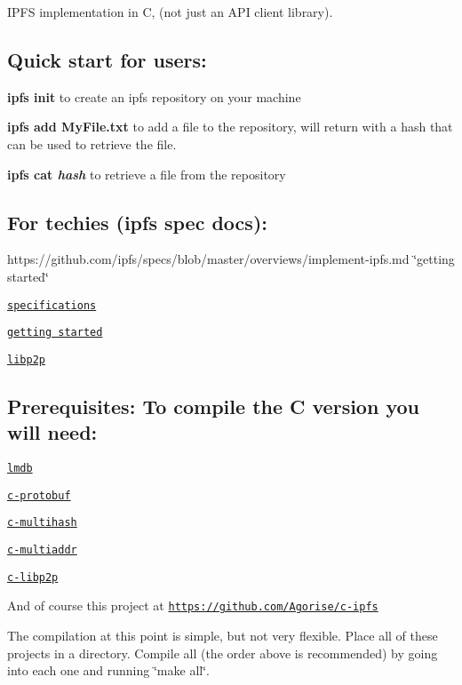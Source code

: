 I\+P\+FS implementation in C, (not just an A\+PI client library).

\subsection*{Quick start for users\+:}


\begin{DoxyItemize}
\item {\bfseries ipfs init} to create an ipfs repository on your machine
\item {\bfseries ipfs add My\+File.\+txt} to add a file to the repository, will return with a hash that can be used to retrieve the file.
\item {\bfseries ipfs cat {\itshape hash}} to retrieve a file from the repository
\end{DoxyItemize}

\subsection*{For techies (ipfs spec docs)\+:}


\begin{DoxyItemize}
\item https\+://github.com/ipfs/specs/blob/master/overviews/implement-\/ipfs.\+md \char`\"{}getting started\char`\"{}
\item \href{https://github.com/ipfs/specs}{\tt specifications}
\item \href{https://github.com/ipfs/community/issues/177}{\tt getting started}
\item \href{https://github.com/libp2p/specs}{\tt libp2p}
\end{DoxyItemize}

\subsection*{Prerequisites\+: To compile the C version you will need\+:}


\begin{DoxyItemize}
\item \href{https://github.com/jmjatlanta/lmdb}{\tt lmdb}
\item \href{https://github.com/Agorise/c-protobuf}{\tt c-\/protobuf}
\item \href{https://github.com/Agorise/c-multihash}{\tt c-\/multihash}
\item \href{https://github.com/Agorise/c-multiaddr}{\tt c-\/multiaddr}
\item \href{https://github.com/Agorise/c-libp2p}{\tt c-\/libp2p}
\end{DoxyItemize}

And of course this project at \href{https://github.com/Agorise/c-ipfs}{\tt https\+://github.\+com/\+Agorise/c-\/ipfs}

The compilation at this point is simple, but not very flexible. Place all of these projects in a directory. Compile all (the order above is recommended) by going into each one and running \char`\"{}make all\char`\"{}. 